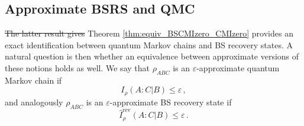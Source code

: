\documentclass[11pt]{article}
\theoremstyle{newdefinition}
\theoremstyle{newplain}
\theoremstyle{myplain}
\DeclareMathOperator{\1}{\mathds{1}}
\newcommand{\PCR}[1]{{\color{blue}#1}}
\begin{document}
  


\subsection{Approximate BSRS and QMC}

\PCR{\sout{The latter result gives} Theorem \ref{thm:equiv_BSCMIzero_CMIzero} provides } an exact identification between quantum Markov chains and BS recovery states. A natural question is then whether an equivalence between approximate versions of these notions holds as well. We say that $\rho_{ABC}$ is an $\varepsilon$-approximate quantum Markov chain if
\begin{equation}
    I_\rho(A:C|B) \leq \varepsilon \, ,
\end{equation}
and analogously $\rho_{ABC}$ is an $\varepsilon$-approximate BS recovery state if 
\begin{equation}
    \widehat{I}^{\text{rev}}_\rho(A:C|B) \leq \varepsilon \, . 
\end{equation}
\end{document}
